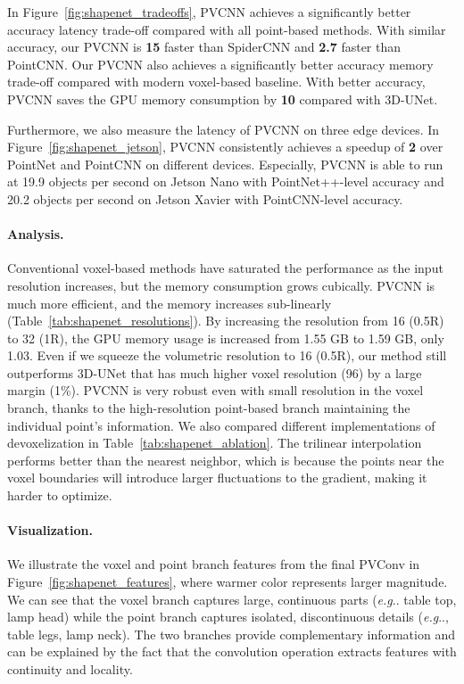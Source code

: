 \documentclass{article}
\makeatletter
\newcommand{\fig}[1]{Figure~\ref{#1}}
\newcommand{\tab}[1]{Table~\ref{#1}}
\DeclareRobustCommand\onedot{\futurelet\@let@token\@onedot}
\def\@onedot{\ifx\@let@token.\else.\null\fi\xspace}
\def\eg{\emph{e.g}\onedot} \def\Eg{\emph{E.g}\onedot}
\newcommand{\myparagraph}[1]{\vspace{-6pt}\paragraph{#1}}
\def\modelshort{PVCNN\xspace}
\def\convshort{PVConv\xspace}
\makeatother
\begin{document}
In \fig{fig:shapenet_tradeoffs}, \modelshort achieves a significantly better accuracy \vs latency trade-off compared with all point-based methods. With similar accuracy, our \modelshort is \textbf{15} faster than SpiderCNN and \textbf{2.7} faster than PointCNN. Our \modelshort also achieves a significantly better accuracy \vs memory trade-off compared with modern voxel-based baseline. With better accuracy, \modelshort saves the GPU memory consumption by \textbf{10} compared with 3D-UNet.

Furthermore, we also measure the latency of \modelshort on three edge devices. In \fig{fig:shapenet_jetson}, \modelshort consistently achieves a speedup of \textbf{2} over PointNet and PointCNN  on different devices. Especially, \modelshort is able to run at 19.9 objects per second on Jetson Nano with PointNet++-level accuracy and 20.2 objects per second on Jetson Xavier with PointCNN-level accuracy.

\myparagraph{Analysis.}

Conventional voxel-based methods have saturated the performance as the input resolution increases, but the memory consumption grows cubically. \modelshort is much more efficient, and the memory increases sub-linearly (\tab{tab:shapenet_resolutions}). By increasing the resolution from 16 (0.5R) to 32 (1R), the GPU memory usage is increased from 1.55 GB to 1.59 GB, only 1.03. Even if we squeeze the volumetric resolution to 16 (0.5R), our method still outperforms 3D-UNet that has much higher voxel resolution (96) by a large margin (1\%). \modelshort is very robust even with small resolution in the voxel branch, thanks to the high-resolution point-based branch maintaining the individual point's information. We also compared different implementations of devoxelization in \tab{tab:shapenet_ablation}. The trilinear interpolation performs better than the nearest neighbor, which is because the points near the voxel boundaries will introduce larger fluctuations to the gradient, making it harder to optimize.

\myparagraph{Visualization.}

We illustrate the voxel and point branch features from the final \convshort in \fig{fig:shapenet_features}, where warmer color represents larger magnitude. We can see that the voxel branch captures large, continuous parts (\eg table top, lamp head) while the point branch captures isolated, discontinuous details (\eg, table legs, lamp neck). The two branches provide complementary information and can be explained by the fact that the convolution operation extracts features with continuity and locality.
\end{document}
